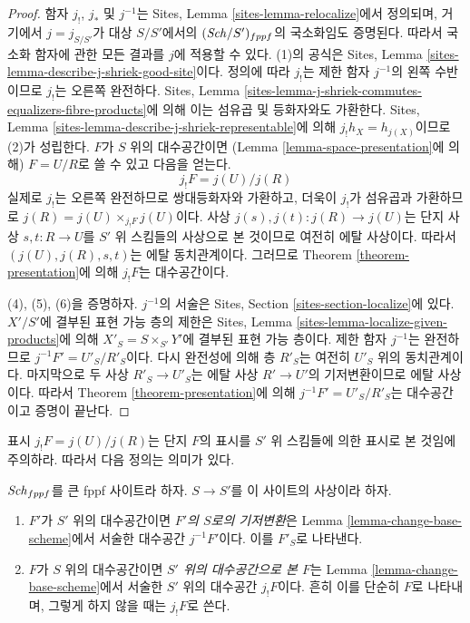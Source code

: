 \begin{proof}
함자 $j_!$, $j_*$ 및 $j^{-1}$는 Sites, Lemma
\ref{sites-lemma-relocalize}에서 정의되며, 거기에서
$j = j_{S/S'}$가 대상 $S/S'$에서의 $(\mathit{Sch}/S')_{fppf}$의
국소화임도 증명된다. 따라서 국소화 함자에 관한 모든 결과를
$j$에 적용할 수 있다.
(1)의 공식은 Sites, Lemma
\ref{sites-lemma-describe-j-shriek-good-site}이다.
정의에 따라 $j_!$는 제한 함자 $j^{-1}$의 왼쪽 수반이므로
$j_!$는 오른쪽 완전하다. Sites, Lemma
\ref{sites-lemma-j-shriek-commutes-equalizers-fibre-products}에
의해 이는 섬유곱 및 등화자와도 가환한다.
Sites, Lemma \ref{sites-lemma-describe-j-shriek-representable}에
의해 $j_!h_X = h_{j(X)}$이므로 (2)가 성립한다.
$F$가 $S$ 위의 대수공간이면
(Lemma \ref{lemma-space-presentation}에 의해)
$F = U/R$로 쓸 수 있고 다음을 얻는다.
$$
j_!F = j(U)/j(R)
$$
실제로 $j_!$는 오른쪽 완전하므로 쌍대등화자와 가환하고,
더욱이 $j_!$가 섬유곱과 가환하므로
$j(R) = j(U) \times_{j_!F} j(U)$이다.
사상 $j(s), j(t) : j(R) \to j(U)$는 단지 사상
$s, t : R \to U$를 $S'$ 위 스킴들의 사상으로 본 것이므로
여전히 에탈 사상이다. 따라서 $(j(U), j(R), s, t)$는 에탈
동치관계이다. 그러므로 Theorem \ref{theorem-presentation}에 의해
$j_!F$는 대수공간이다.

\medskip\noindent
(4), (5), (6)을 증명하자. $j^{-1}$의 서술은 Sites, Section
\ref{sites-section-localize}에 있다.
$X'/S'$에 결부된 표현 가능 층의 제한은 Sites, Lemma
\ref{sites-lemma-localize-given-products}에 의해
$X'_S = S \times_{S'} Y'$에 결부된 표현 가능 층이다.
제한 함자 $j^{-1}$는 완전하므로 $j^{-1}F' = U'_S/R'_S$이다.
다시 완전성에 의해 층 $R'_S$는 여전히 $U'_S$ 위의 동치관계이다.
마지막으로 두 사상 $R'_S \to U'_S$는 에탈 사상 $R' \to U'$의
기저변환이므로 에탈 사상이다. 따라서 Theorem
\ref{theorem-presentation}에 의해 $j^{-1}F' = U'_S/R'_S$는
대수공간이고 증명이 끝난다.
\end{proof}

\noindent
표시 $j_!F = j(U)/j(R)$는 단지 $F$의 표시를 $S'$ 위 스킴들에
의한 표시로 본 것임에 주의하라. 따라서 다음 정의는 의미가 있다.

\begin{definition}
\label{definition-base-change}
$\mathit{Sch}_{fppf}$를 큰 fppf 사이트라 하자.
$S \to S'$를 이 사이트의 사상이라 하자.
\begin{enumerate}
\item $F'$가 $S'$ 위의 대수공간이면
{\it $F'$의 $S$로의 기저변환}은 Lemma
\ref{lemma-change-base-scheme}에서 서술한 대수공간
$j^{-1}F'$이다. 이를 $F'_S$로 나타낸다.
\item $F$가 $S$ 위의 대수공간이면
{\it $S'$ 위의 대수공간으로 본 $F$}는 Lemma
\ref{lemma-change-base-scheme}에서 서술한 $S'$ 위의
대수공간 $j_!F$이다. 흔히 이를 단순히 $F$로 나타내며,
그렇게 하지 않을 때는 $j_!F$로 쓴다.
\end{enumerate}
\end{definition}

